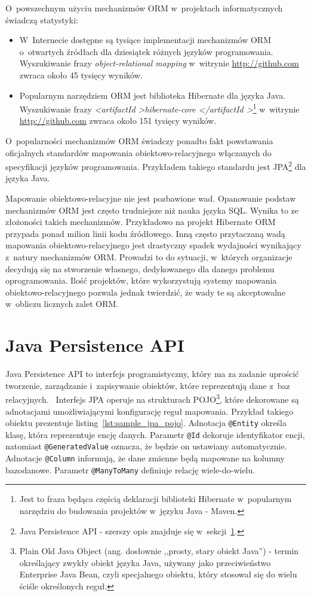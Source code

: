 O~powszechnym użyciu mechanizmów ORM w~projektach informatycznych świadczą statystyki:

\begin{itemize}
	\item W~Internecie dostępne są tysiące implementacji mechanizmów ORM o~otwartych źródłach dla dziesiątek różnych języków programowania. Wyszukiwanie frazy \emph{object-relational mapping} w~witrynie \url{http://github.com} zwraca około 45 tysięcy wyników.
	\item Popularnym narzędziem ORM jest biblioteka Hibernate dla języka Java. Wyszukiwanie frazy \emph{\textless artifactId \textgreater hibernate-core \textless /artifactId \textgreater}\footnote{Jest to fraza będąca częścią deklaracji biblioteki Hibernate w~popularnym narzędziu do budowania projektów w~języku Java - Maven.} w~witrynie \url{http://github.com} zwraca około 151 tysięcy wyników.
\end{itemize}

O~popularności mechanizmów ORM świadczy ponadto fakt powstawania oficjalnych standardów mapowania obiektowo-relacyjnego włączanych do specyfikacji języków programowania. Przykładem takiego standardu jest JPA\footnote{Java Persistence API - szerszy opis znajduje się w~sekcji~\ref{sec:jpa}.} dla języka Java.

Mapowanie obiektowo-relacyjne nie jest pozbawione wad. Opanowanie podstaw mechanizmów ORM jest często trudniejsze niż nauka języka SQL. Wynika to ze złożoności takich mechanizmów. Przykładowo na projekt Hibernate ORM przypada ponad milion linii kodu źródłowego. Inną często przytaczaną wadą mapowania obiektowo-relacyjnego jest drastyczny spadek wydajności wynikający z~natury mechanizmów ORM. Prowadzi to do sytuacji, w~których organizacje decydują się na stworzenie własnego, dedykowanego dla danego problemu oprogramowania. Ilość projektów, które wykorzystują systemy mapowania obiektowo-relacyjnego pozwala jednak twierdzić, że wady te są akceptowalne w~obliczu licznych zalet ORM.

\section{Java Persistence API}
\label{sec:jpa}

Java Persistence API to interfejs programistyczny, który ma za zadanie uprościć tworzenie, zarządzanie i~zapisywanie obiektów, które reprezentują dane z~baz relacyjnych.~\cite{jpa_documentation} Interfejs JPA operuje na strukturach POJO\footnote{Plain Old Java Object (ang. dosłownie ,,prosty, stary obiekt Java'') - termin określający zwykły obiekt języka Java, używany jako przeciwieństwo Enterprise Java Bean, czyli specjalnego obiektu, który stosował się do wielu ściśle określonych reguł.}, które dekorowane są adnotacjami umożliwiającymi konfigurację reguł mapowania. Przykład takiego obiektu prezentuje listing~\ref{lst:sample_jpa_pojo}. Adnotacja \verb+@Entity+ określa klasę, która reprezentuje encję danych. Parametr \verb+@Id+ dekoruje identyfikator encji, natomiast \verb+@GeneratedValue+ oznacza, że będzie on ustawiany automatycznie. Adnotacje \verb+@Column+ informują, że dane zmienne będą mapowane na kolumny bazodanowe. Parametr \verb+@ManyToMany+ definiuje relację wiele-do-wielu. 

